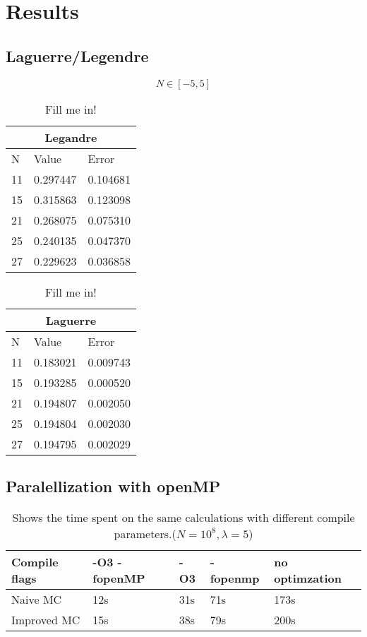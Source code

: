 \documentclass[../main.tex]{subfiles}
\begin{document}
\section{Results} \label{sec:results}
\subsection{Laguerre/Legendre} \label{sec:QMProbresults}


$$N \in [-5,5]$$
\begin{table}
  \begin{tabular}{ |p{1cm}|p{3cm}|p{3cm}|}
 \hline
 \multicolumn{3}{|c}{Legandre} \\
 \hline
       N   & Value & Error\\
 \hline
 11 & 0.297447 & 0.104681\\
 15 & 0.315863 & 0.123098\\
 21 & 0.268075 & 0.075310\\
 25 & 0.240135 & 0.047370\\
 27 & 0.229623 & 0.036858\\
 \hline
 \end{tabular}
 \caption{Fill me in!}
\end{table}

\begin{table}
\begin{tabular}{ |p{1cm}|p{3cm}|p{3cm}|}
 \hline
 \multicolumn{3}{|c}{Laguerre} \\
 \hline
       N   & Value & Error\\
 \hline
 11 &  0.183021 &  0.009743\\
 15 &  0.193285 &  0.000520\\
 21 &  0.194807 &  0.002050\\
 25 &  0.194804 &  0.002030\\
 27 &  0.194795 &  0.002029\\

 \hline
\end{tabular}
\caption{Fill me in!}
\end{table}

\FloatBarrier
\subsection{Paralellization with openMP} \label{sec:res-paralell}
\begin{table}[!h]
    \begin{tabular}{ l | l l l l }

        Compile flags & -O3 -fopenMP \hspace{5mm} & -O3 \hspace{1cm} & -fopenmp\hspace{5mm} & no optimzation \\
        \hline
        Naive MC      & 12s          & 31s &    71s      & 173s           \\
        Improved MC   & 15s          & 38s &     79s     & 200s
    \end{tabular}
    \caption{Shows the time spent on the same calculations with different compile parameters.($N = 10^8, \lambda = 5$)}
\end{table}
\end{document}

